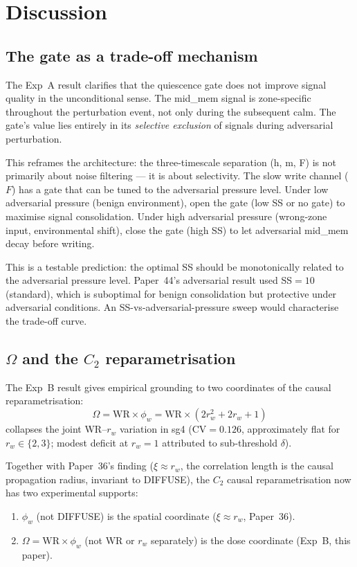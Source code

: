 \documentclass[11pt,a4paper]{article}
\begin{document}
\section{Discussion}

\subsection{The gate as a trade-off mechanism}

The Exp~A result clarifies that the quiescence gate does not improve signal quality
in the unconditional sense.
The mid\_mem signal is zone-specific throughout the perturbation event, not only
during the subsequent calm.
The gate's value lies entirely in its \emph{selective exclusion} of signals during
adversarial perturbation.

This reframes the architecture:
the three-timescale separation (h, m, F) is not primarily about noise filtering ---
it is about selectivity.
The slow write channel ($F$) has a gate that can be tuned to the adversarial pressure level.
Under low adversarial pressure (benign environment), open the gate (low SS or no gate)
to maximise signal consolidation.
Under high adversarial pressure (wrong-zone input, environmental shift), close the gate
(high SS) to let adversarial mid\_mem decay before writing.

This is a testable prediction: the optimal SS should be monotonically related
to the adversarial pressure level.
Paper~44's adversarial result used SS$=10$ (standard), which is suboptimal for benign
consolidation but protective under adversarial conditions.
An SS-vs-adversarial-pressure sweep would characterise the trade-off curve.

\subsection{$\Omega$ and the $C_2$ reparametrisation}

The Exp~B result gives empirical grounding to two coordinates of the causal
reparametrisation:
\begin{equation}
  \Omega = \mathrm{WR}\times\phi_w = \mathrm{WR}\times(2r_w^2+2r_w+1)
\end{equation}
collapses the joint WR--$r_w$ variation in sg4 (CV$=0.126$, approximately flat for
$r_w \in \{2,3\}$; modest deficit at $r_w=1$ attributed to sub-threshold $\delta$).

Together with Paper~36's finding ($\xi \approx r_w$, the correlation length is the
causal propagation radius, invariant to DIFFUSE), the $C_2$ causal reparametrisation
now has two experimental supports:
\begin{enumerate}
\item $\phi_w$ (not DIFFUSE) is the spatial coordinate ($\xi \approx r_w$, Paper~36).
\item $\Omega = \mathrm{WR}\times\phi_w$ (not WR or $r_w$ separately) is the dose
  coordinate (Exp~B, this paper).
\end{enumerate}
\end{document}
